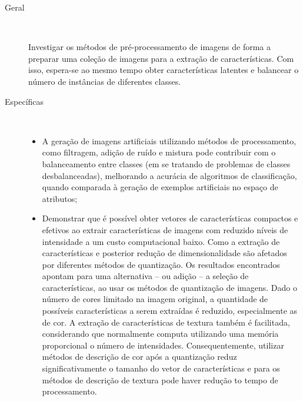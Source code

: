 \begin{description}
\item[Geral] \

Investigar os métodos de pré-processamento de imagens de forma a preparar uma coleção de imagens para a extração de características. Com isso, espera-se ao mesmo tempo obter características latentes e balancear o número de instâncias de diferentes classes.

\item[Específicas] \

  \begin{itemize}
    \item A geração de imagens artificiais utilizando métodos de processamento, como filtragem, adição de ruído e mistura pode contribuir com o balanceamento entre classes (em se tratando de problemas de classes desbalanceadas), melhorando a acurácia de algoritmos de classificação, quando comparada à geração de exemplos artificiais no espaço de atributos;
    \item

    Demonstrar que é possível obter vetores de características compactos e efetivos ao extrair características de imagens com reduzido níveis de intensidade a um custo computacional baixo. Como a extração de características e posterior redução de dimensionalidade são afetados por diferentes métodos de quantização. Os resultados encontrados apontam para uma alternativa -- ou adição -- a seleção de características, ao usar os métodos de quantização de imagens. Dado o número de cores limitado na imagem original, a quantidade de possíveis características a serem extraídas é reduzido, especialmente as de cor. A extração de características de textura também é facilitada, considerando que normalmente computa utilizando uma memória proporcional o número de intensidades. Consequentemente, utilizar métodos de descrição de cor após a quantização reduz significativamente o tamanho do vetor de características e para os métodos de descrição de textura pode haver redução to tempo de processamento.

  \end{itemize}
\end{description}


